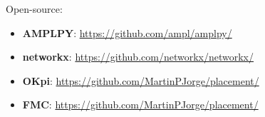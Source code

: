 \documentclass[aspectratio=169]{beamer}
\begin{document}
\begin{frame}
    \frametitle{\secname}
    \framesubtitle{\subsecname}
    Open-source:
    \begin{itemize}
        \item \textbf{AMPLPY}: \url{https://github.com/ampl/amplpy/}
        \item \textbf{networkx}: \url{https://github.com/networkx/networkx/}
        \item \textbf{OKpi}: \url{https://github.com/MartinPJorge/placement/}
        \item \textbf{FMC}: \url{https://github.com/MartinPJorge/placement/}
    \end{itemize}
\end{frame}
\end{document}
